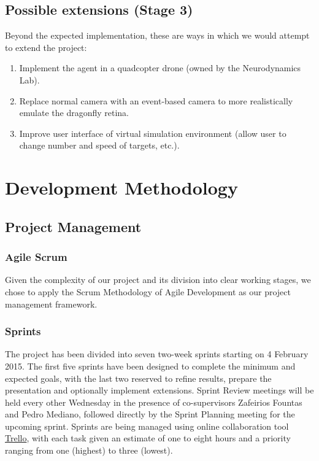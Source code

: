 \documentclass[a4paper,11pt]{article}
\begin{document}
 	\subsection{Possible extensions (Stage 3)}
 	
 	Beyond the expected implementation, these are ways in which we would attempt to extend the project:
 \begin{enumerate}
 	\item Implement the agent in a quadcopter drone (owned by the Neurodynamics Lab).
 	\item Replace normal camera with an event-based camera to more realistically emulate the dragonfly retina.
 	\item Improve user interface of virtual simulation environment (allow user to change number and speed of targets, etc.). 
 \end{enumerate}

\section{Development Methodology}

\subsection{Project Management}

\subsubsection{Agile Scrum}

Given the complexity of our project and its division into clear working stages, we chose to apply the Scrum Methodology of Agile Development as our project management framework.

\subsubsection{Sprints}
The project has been divided into seven two-week sprints starting on 4 February 2015. The first five sprints have been designed to complete the minimum and expected goals, with the last two reserved to refine results, prepare the presentation and optionally implement extensions. Sprint Review meetings will be held every other Wednesday in the presence of co-supervisors Zafeirios Fountas and Pedro Mediano, followed directly by the Sprint Planning meeting for the upcoming sprint. Sprints are being managed using online collaboration tool \href{http://trello.com}{Trello}, with each task given an estimate of one to eight hours and a priority ranging from one (highest) to three (lowest).
\end{document}
